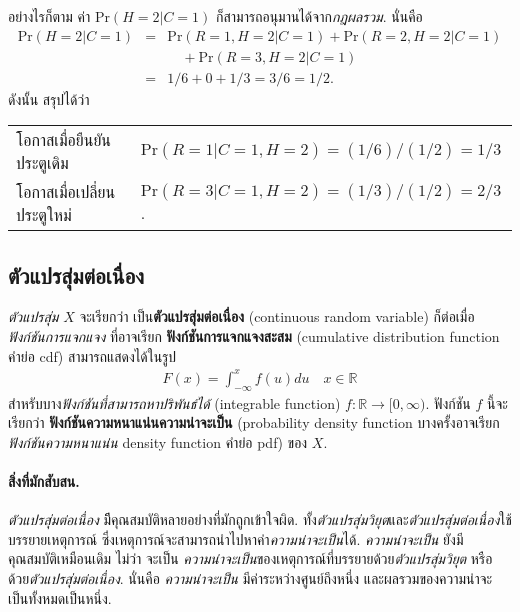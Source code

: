 อย่างไรก็ตาม ค่า $\mathrm{Pr}(H = 2|C = 1)$ ก็สามารถอนุมานได้จาก\textit{กฎผลรวม}.
นั่นคือ
\begin{eqnarray}
\mathrm{Pr}(H = 2|C = 1) 
&=& \mathrm{Pr}(R = 1, H = 2|C = 1) +
\mathrm{Pr}(R = 2, H = 2|C = 1) 
\nonumber \\
&\;& \quad
+
\mathrm{Pr}(R = 3, H = 2|C = 1)
\nonumber \\
&=& 1/6 + 0 + 1/3 = 3/6 = 1/2
\nonumber .
\end{eqnarray}
ดังนั้น สรุปได้ว่า
\\
\begin{tabular}{ll}
โอกาสเมื่อยืนยันประตูเดิม &
$\mathrm{Pr}(R = 1|C =1, H = 2) = (1/6)/(1/2) = 1/3$
\\
โอกาสเมื่อเปลี่ยนประตูใหม่ &
$\mathrm{Pr}(R = 3|C =1, H = 2) = (1/3)/(1/2) = 2/3$.
\end{tabular}

\subsection{ตัวแปรสุ่มต่อเนื่อง}
\label{sec: continuous random variable}
\textit{ตัวแปรสุ่ม} $X$ จะเรียกว่า
เป็น\textbf{ตัวแปรสุ่มต่อเนื่อง} (continuous random variable)
ก็ต่อเมื่อ
\textit{ฟังก์ชันการแจกแจง}
ที่อาจเรียก
\textbf{ฟังก์ชันการแจกแจงสะสม} (cumulative distribution function คำย่อ cdf)
สามารถแสดงได้ในรูป
\begin{eqnarray}
F(x) = \int_{-\infty}^x f(u) du
\quad x \in \mathbb{R}
\label{eq: prob continuous rv}
\end{eqnarray}
สำหรับบาง\textit{ฟังก์ชันที่สามารถหาปริพันธ์ได้} (integrable function) $f: \mathbb{R} \rightarrow [0, \infty)$.
ฟังก์ชัน $f$ นี้จะเรียกว่า 
\textbf{ฟังก์ชันความหนาแน่นความน่าจะเป็น}
(probability density function บางครั้งอาจเรียก
\textit{ฟังก์ชันความหนาแน่น} density function คำย่อ pdf) ของ $X$.

\paragraph{สิ่งที่มักสับสน.}
\textit{ตัวแปรสุ่มต่อเนื่อง}
มีีคุณสมบัติหลายอย่างที่มักถูกเข้าใจผิด.
ทั้ง\textit{ตัวแปรสุ่มวิยุต}และ\textit{ตัวแปรสุ่มต่อเนื่อง}ใช้บรรยายเหตุการณ์ ซึ่งเหตุการณ์จะสามารถนำไปหาค่า\textit{ความน่าจะเป็น}ได้.
\textit{ความน่าจะเป็น}
ยังมีคุณสมบัติเหมือนเดิม 
ไม่ว่า
จะเป็น
\textit{ความน่าจะเป็น}ของเหตุการณ์ที่บรรยายด้วย\textit{ตัวแปรสุ่มวิยุต}
หรือด้วย\textit{ตัวแปรสุ่มต่อเนื่อง}.
นั่นคือ
\textit{ความน่าจะเป็น}
มีค่าระหว่างศูนย์ถึงหนึ่ง 
และผลรวมของความน่าจะเป็นทั้งหมดเป็นหนึ่ง.

